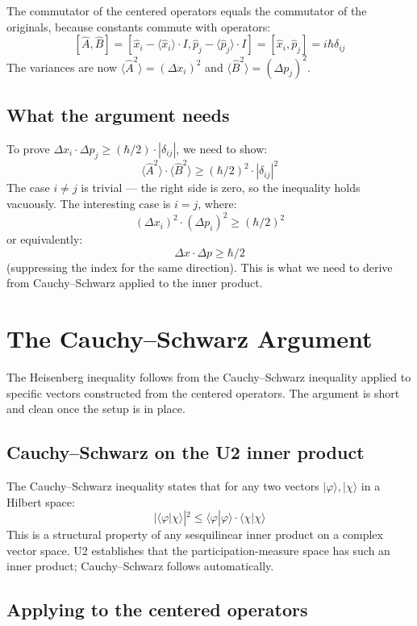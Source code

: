 \documentclass[11pt,a4paper]{article}
\begin{document}
The commutator of the centered operators equals the commutator of the originals, because constants commute with operators:
\[
[\hat{A}, \hat{B}] = [\hat{x}_i - \langle\hat{x}_i\rangle\cdot I, \hat{p}_j - \langle\hat{p}_j\rangle\cdot I] = [\hat{x}_i, \hat{p}_j] = i\hbar\delta_{ij}
\]
The variances are now $\langle\hat{A}^{2}\rangle = (\Delta x_i)^2$ and $\langle\hat{B}^{2}\rangle = (\Delta p_j)^2$.

\subsection{What the argument needs}

To prove $\Delta x_i \cdot \Delta p_j \geq (\hbar/2)\cdot|\delta_{ij}|$, we need to show:
\[
\langle\hat{A}^{2}\rangle \cdot \langle\hat{B}^{2}\rangle \geq (\hbar/2)^{2}\cdot|\delta_{ij}|^{2}
\]
The case $i \neq j$ is trivial --- the right side is zero, so the inequality holds vacuously. The interesting case is $i = j$, where:
\[
(\Delta x_i)^{2}\cdot(\Delta p_i)^{2} \geq (\hbar/2)^{2}
\]
or equivalently:
\[
\Delta x\cdot\Delta p \geq \hbar/2
\]
(suppressing the index for the same direction). This is what we need to derive from Cauchy--Schwarz applied to the inner product.

\section{The Cauchy--Schwarz Argument}

The Heisenberg inequality follows from the Cauchy--Schwarz inequality applied to specific vectors constructed from the centered operators. The argument is short and clean once the setup is in place.

\subsection{Cauchy--Schwarz on the U2 inner product}

The Cauchy--Schwarz inequality states that for any two vectors $|\varphi\rangle, |\chi\rangle$ in a Hilbert space:
\[
|\langle\varphi|\chi\rangle|^{2} \leq \langle\varphi|\varphi\rangle\cdot\langle\chi|\chi\rangle
\]
This is a structural property of any sesquilinear inner product on a complex vector space. U2 establishes that the participation-measure space has such an inner product; Cauchy--Schwarz follows automatically.

\subsection{Applying to the centered operators}
\end{document}
